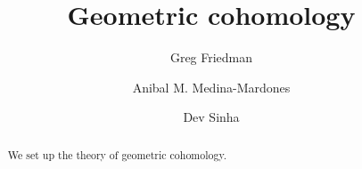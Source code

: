 \documentclass{amsart}
\title{Geometric cohomology}
\author[G. Friedman]{Greg Friedman}
\author[A. Medina-Mardones]{Anibal M. Medina-Mardones}
\author[D. Sinha]{Dev Sinha}
\begin{document}
	\begin{abstract}
		We set up the theory of geometric cohomology.
	\end{abstract}
	\maketitle
	\tableofcontents
	
	
	
	
	\pagebreak
\end{document}
